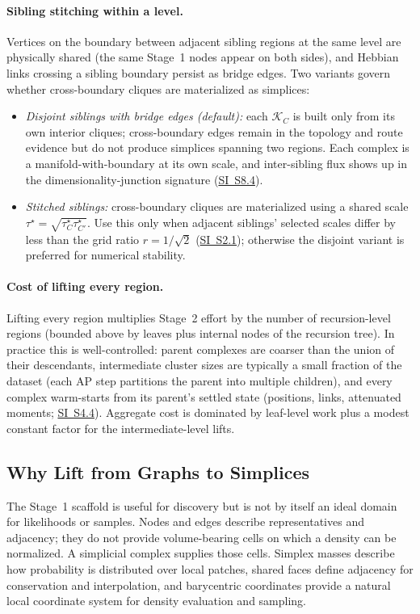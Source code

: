 \documentclass[11pt]{article}
\theoremstyle{definition}
\theoremstyle{plain}
\begin{document}
\paragraph{Sibling stitching within a level.}
Vertices on the boundary between adjacent sibling regions at the same level are physically shared (the same Stage~1 nodes appear on both sides), and Hebbian links crossing a sibling boundary persist as bridge edges. Two variants govern whether cross-boundary cliques are materialized as simplices:
\begin{itemize}[leftmargin=1.5em]
    \item \emph{Disjoint siblings with bridge edges (default):} each $\mathcal K_C$ is built only from its own interior cliques; cross-boundary edges remain in the topology and route evidence but do not produce simplices spanning two regions. Each complex is a manifold-with-boundary at its own scale, and inter-sibling flux shows up in the dimensionality-junction signature (\hyperref[sec:si-junction-freeze]{SI~S8.4}).
    \item \emph{Stitched siblings:} cross-boundary cliques are materialized using a shared scale $\tau^\star=\sqrt{\tau_C^\star\tau_{C'}^\star}$. Use this only when adjacent siblings' selected scales differ by less than the grid ratio $r=1/\sqrt{2}$ (\hyperref[sec:si-grid-spacing]{SI~S2.1}); otherwise the disjoint variant is preferred for numerical stability.
\end{itemize}

\paragraph{Cost of lifting every region.}
Lifting every region multiplies Stage~2 effort by the number of recursion-level regions (bounded above by leaves plus internal nodes of the recursion tree). In practice this is well-controlled: parent complexes are coarser than the union of their descendants, intermediate cluster sizes are typically a small fraction of the dataset (each AP step partitions the parent into multiple children), and every complex warm-starts from its parent's settled state (positions, links, attenuated moments; \hyperref[sec:si-transition-policies]{SI~S4.4}). Aggregate cost is dominated by leaf-level work plus a modest constant factor for the intermediate-level lifts.

\subsection{Why Lift from Graphs to Simplices}
The Stage~1 scaffold is useful for discovery but is not by itself an ideal domain for likelihoods or samples. Nodes and edges describe representatives and adjacency; they do not provide volume-bearing cells on which a density can be normalized. A simplicial complex supplies those cells. Simplex masses describe how probability is distributed over local patches, shared faces define adjacency for conservation and interpolation, and barycentric coordinates provide a natural local coordinate system for density evaluation and sampling.
\end{document}
